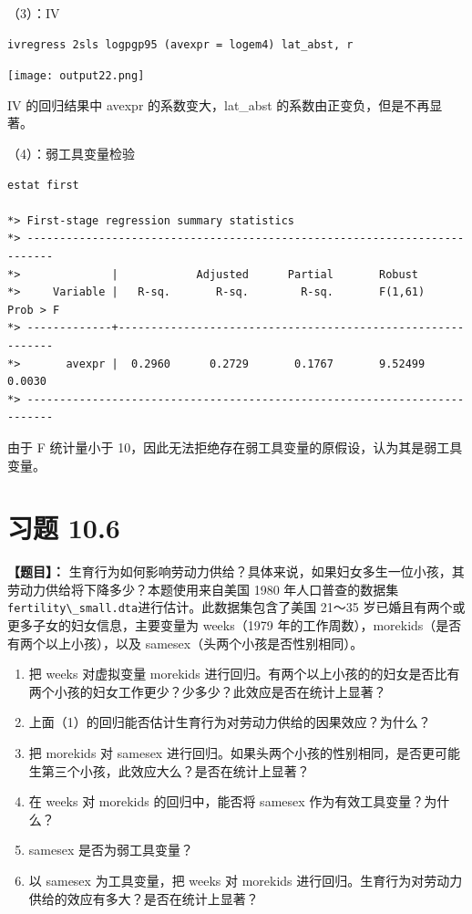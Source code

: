 \documentclass[cn,fancy,blue,11pt]{elegantbook}
\begin{document}
（3）：IV

\begin{lstlisting}
ivregress 2sls logpgp95 (avexpr = logem4) lat_abst, r
\end{lstlisting}

\noindent\texttt{[image: output22.png]}

IV 的回归结果中 avexpr 的系数变大，lat\_abst 的系数由正变负，但是不再显著。

（4）：弱工具变量检验

\begin{lstlisting}
estat first

*> First-stage regression summary statistics
*> --------------------------------------------------------------------------
*>              |            Adjusted      Partial       Robust
*>     Variable |   R-sq.       R-sq.        R-sq.       F(1,61)   Prob > F
*> -------------+------------------------------------------------------------
*>       avexpr |  0.2960      0.2729       0.1767       9.52499    0.0030
*> --------------------------------------------------------------------------
\end{lstlisting}

由于 F 统计量小于 10，因此无法拒绝存在弱工具变量的原假设，认为其是弱工具变量。

\hypertarget{section-51}{%
\section{习题 10.6}\label{section-51}}

\textbf{【题目】：}
生育行为如何影响劳动力供给？具体来说，如果妇女多生一位小孩，其劳动力供给将下降多少？本题使用来自美国 1980 年人口普查的数据集\lstinline{fertility\_small.dta}进行估计。此数据集包含了美国 21～35 岁已婚且有两个或更多子女的妇女信息，主要变量为 weeks（1979 年的工作周数），morekids（是否有两个以上小孩），以及 samesex（头两个小孩是否性别相同）。

\begin{enumerate}
\item
  把 weeks 对虚拟变量 morekids 进行回归。有两个以上小孩的的妇女是否比有两个小孩的妇女工作更少？少多少？此效应是否在统计上显著？
\item
  上面（1）的回归能否估计生育行为对劳动力供给的因果效应？为什么？
\item
  把 morekids 对 samesex 进行回归。如果头两个小孩的性别相同，是否更可能生第三个小孩，此效应大么？是否在统计上显著？
\item
  在 weeks 对 morekids 的回归中，能否将 samesex 作为有效工具变量？为什么？
\item
  samesex 是否为弱工具变量？
\item
  以 samesex 为工具变量，把 weeks 对 morekids 进行回归。生育行为对劳动力供给的效应有多大？是否在统计上显著？
\end{enumerate}
\end{document}
